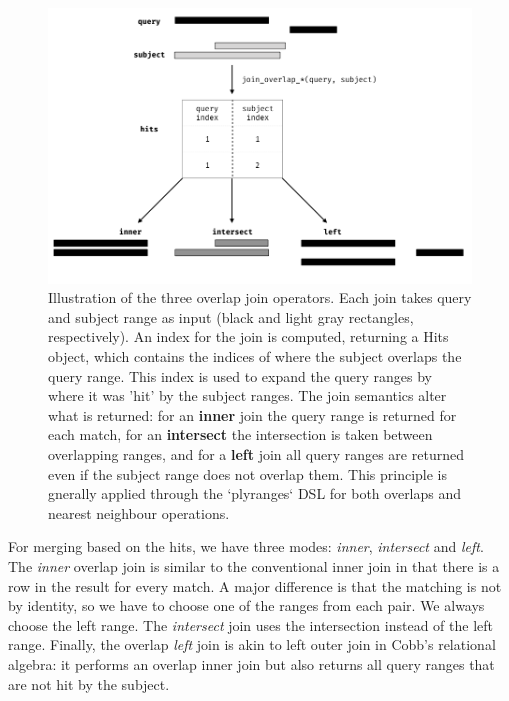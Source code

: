\documentclass[]{article}
\begin{document}
\begin{figure}

{\centering \includegraphics[width=\textwidth]{diagrams/diagrams-002} 

}

\caption{Illustration of the three overlap join operators. Each join takes query and subject range as input (black and light gray rectangles, respectively). An index for the join is computed, returning a Hits object, which contains the indices of where the subject overlaps the query range. This index is used to expand the query ranges by where it was 'hit' by the subject ranges. The join semantics alter what is returned: for an \textbf{inner} join the query range is returned for each match, for an \textbf{intersect} the intersection is taken between overlapping ranges, and for a \textbf{left} join all query ranges are returned even if the subject range does not overlap them. This principle is gnerally applied through the `plyranges` DSL for both overlaps and nearest neighbour operations.}\label{fig:olaps-fig}
\end{figure}

For merging based on the hits, we have three modes: \emph{inner},
\emph{intersect} and \emph{left}. The \emph{inner} overlap join is
similar to the conventional inner join in that there is a row in the
result for every match. A major difference is that the matching is not
by identity, so we have to choose one of the ranges from each pair. We
always choose the left range. The \emph{intersect} join uses the
intersection instead of the left range. Finally, the overlap \emph{left}
join is akin to left outer join in Cobb's relational algebra: it
performs an overlap inner join but also returns all query ranges that
are not hit by the subject.
\end{document}
